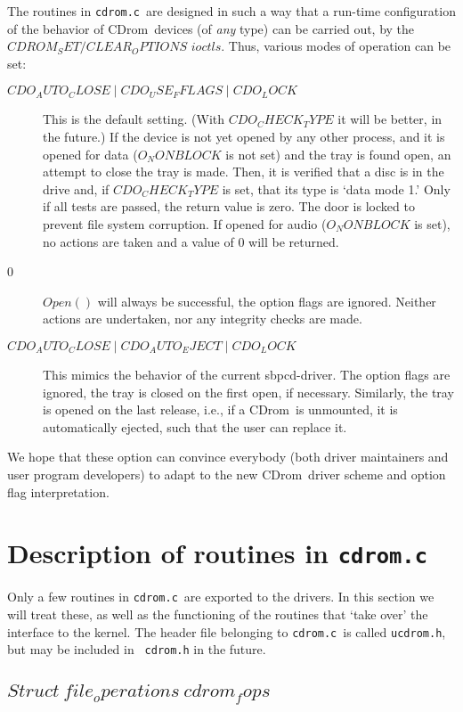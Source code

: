 \documentclass{article}
\def\cdrom{{\sc CDrom}}
\def\cdromc{{\tt cdrom.c}}
\def\ucdrom{{\tt ucdrom.h}}
\begin{document}
The routines in \cdromc\ are designed in such a way that a run-time
configuration of the behavior of \cdrom\ devices (of {\em any\/} type)
can be carried out, by the $CDROM_SET/CLEAR_OPTIONS$ $ioctls$. Thus, various
modes of operation can be set:
\begin{description}
\item[$CDO_AUTO_CLOSE \mathrel| CDO_USE_FFLAGS \mathrel| CDO_LOCK$]
This is the default setting. (With $CDO_CHECK_TYPE$ it will be better,
in the future.) If the device is not yet opened by any other process,
and it is opened for data ($O_NONBLOCK$ is not set) and the tray is
found open, an attempt to close the tray is made. Then, it is verified
that a disc is in the drive and, if $CDO_CHECK_TYPE$ is set, that its
type is `data mode 1.' Only if all tests are passed, the return value
is zero. The door is locked to prevent file system corruption. If
opened for audio ($O_NONBLOCK$ is set), no actions are taken and a
value of 0 will be returned.
\item[0] $Open()$ will always be successful, the option flags are
ignored. Neither actions are undertaken, nor any integrity checks are
made. 
\item[$CDO_AUTO_CLOSE \mathrel| CDO_AUTO_EJECT \mathrel| CDO_LOCK$]
This mimics the behavior of the current sbpcd-driver. The option flags
are ignored, the tray is closed on the first open, if
necessary. Similarly, the tray is opened on the last release, i.e., if
a \cdrom\ is unmounted, it is automatically ejected, such that the
user can replace it. 
\end{description}
We hope that these option can convince everybody (both driver
maintainers and user program developers) to adapt to the new \cdrom\
driver scheme and option flag interpretation. 

\section{Description of routines in \cdromc}

Only a few routines in \cdromc\ are exported to the drivers. In this
section we will treat these, as well as the functioning of the routines
that `take over' the interface to the kernel. The header file
belonging to \cdromc\ is called \ucdrom, but may be included in {\tt
cdrom.h} in the future.

\subsection{$Struct\ file_operations\ cdrom_fops$}
\end{document}
